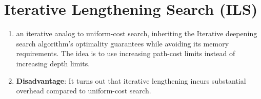 \section{Iterative Lengthening Search (ILS) \cite{ai/book/Artificial-Intelligence-A-Modern-Approach/Russell-Norvig}}
\label{AI: Algorithms/Iterative Lengthening Search (ILS)}


\begin{enumerate}
    \item an iterative analog to uniform-cost search, inheriting the Iterative deepening search algorithm’s optimality guarantees while avoiding its memory requirements. The idea is to use increasing path-cost limits instead of increasing depth limits.
    \hfill \cite{ai/book/Artificial-Intelligence-A-Modern-Approach/Russell-Norvig}

    \item \textbf{Disadvantage}: It turns out that iterative lengthening incurs substantial overhead compared to uniform-cost search.
    \hfill \cite{ai/book/Artificial-Intelligence-A-Modern-Approach/Russell-Norvig}
\end{enumerate}


\vspace{0.5cm}



